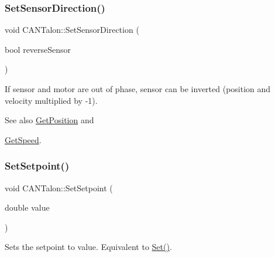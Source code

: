 \mbox{\label{class_c_a_n_talon_a11381d58bbcd47c3fb2235fd76161ff2}} 
\subsubsection{\texorpdfstring{Set\+Sensor\+Direction()}{SetSensorDirection()}}
{\footnotesize\ttfamily void C\+A\+N\+Talon\+::\+Set\+Sensor\+Direction (\begin{DoxyParamCaption}\item[{bool}]{reverse\+Sensor }\end{DoxyParamCaption})}

If sensor and motor are out of phase, sensor can be inverted (position and velocity multiplied by -\/1). \begin{DoxySeeAlso}{See also}
\hyperlink{class_c_a_n_talon_aedc47efb529bd41b55849e628363e661}{Get\+Position} and 

\hyperlink{class_c_a_n_talon_a36e486b58bc5ce1b218d36468900bb1b}{Get\+Speed}. 
\end{DoxySeeAlso}
\mbox{\label{class_c_a_n_talon_abad2c78d5a46552d7e0eac171214083d}} 
\subsubsection{\texorpdfstring{Set\+Setpoint()}{SetSetpoint()}}
{\footnotesize\ttfamily void C\+A\+N\+Talon\+::\+Set\+Setpoint (\begin{DoxyParamCaption}\item[{double}]{value }\end{DoxyParamCaption})\hspace{0.3cm}{\ttfamily [override]}}

Sets the setpoint to value. Equivalent to \hyperlink{class_c_a_n_talon_a4562f7fb454693a0b19e6eba955a0c71}{Set()}. \mbox{\label{class_c_a_n_talon_a7c0071642dbc8c690f7a4d5520f7a8a2}} 
